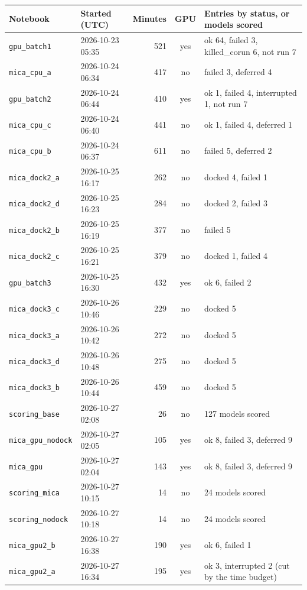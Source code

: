 \begin{tabular}{llrcl}
\toprule
Notebook & Started (UTC) & Minutes & GPU & Entries by status, or models scored \\
\midrule
\texttt{gpu\_batch1} & 2026-10-23 05:35 & 521 & yes & ok 64, failed 3, killed\_corun 6, not run 7 \\
\texttt{mica\_cpu\_a} & 2026-10-24 06:34 & 417 & no & failed 3, deferred 4 \\
\texttt{gpu\_batch2} & 2026-10-24 06:44 & 410 & yes & ok 1, failed 4, interrupted 1, not run 7 \\
\texttt{mica\_cpu\_c} & 2026-10-24 06:40 & 441 & no & ok 1, failed 4, deferred 1 \\
\texttt{mica\_cpu\_b} & 2026-10-24 06:37 & 611 & no & failed 5, deferred 2 \\
\texttt{mica\_dock2\_a} & 2026-10-25 16:17 & 262 & no & docked 4, failed 1 \\
\texttt{mica\_dock2\_d} & 2026-10-25 16:23 & 284 & no & docked 2, failed 3 \\
\texttt{mica\_dock2\_b} & 2026-10-25 16:19 & 377 & no & failed 5 \\
\texttt{mica\_dock2\_c} & 2026-10-25 16:21 & 379 & no & docked 1, failed 4 \\
\texttt{gpu\_batch3} & 2026-10-25 16:30 & 432 & yes & ok 6, failed 2 \\
\texttt{mica\_dock3\_c} & 2026-10-26 10:46 & 229 & no & docked 5 \\
\texttt{mica\_dock3\_a} & 2026-10-26 10:42 & 272 & no & docked 5 \\
\texttt{mica\_dock3\_d} & 2026-10-26 10:48 & 275 & no & docked 5 \\
\texttt{mica\_dock3\_b} & 2026-10-26 10:44 & 459 & no & docked 5 \\
\texttt{scoring\_base} & 2026-10-27 02:08 & 26 & no & 127 models scored \\
\texttt{mica\_gpu\_nodock} & 2026-10-27 02:05 & 105 & yes & ok 8, failed 3, deferred 9 \\
\texttt{mica\_gpu} & 2026-10-27 02:04 & 143 & yes & ok 8, failed 3, deferred 9 \\
\texttt{scoring\_mica} & 2026-10-27 10:15 & 14 & no & 24 models scored \\
\texttt{scoring\_nodock} & 2026-10-27 10:18 & 14 & no & 24 models scored \\
\texttt{mica\_gpu2\_b} & 2026-10-27 16:38 & 190 & yes & ok 6, failed 1 \\
\texttt{mica\_gpu2\_a} & 2026-10-27 16:34 & 195 & yes & ok 3, interrupted 2 (cut by the time budget) \\

\end{tabular}

